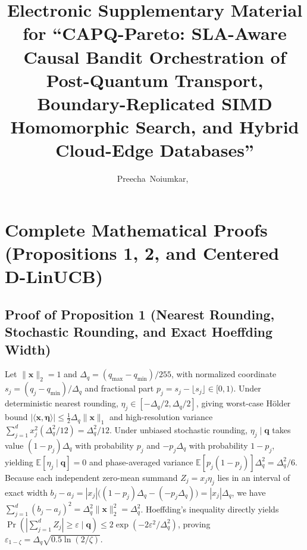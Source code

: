 \documentclass[10pt,journal,compsoc]{IEEEtran}
\begin{document}
\title{Electronic Supplementary Material for ``CAPQ-Pareto: SLA-Aware Causal Bandit Orchestration of Post-Quantum Transport, Boundary-Replicated SIMD Homomorphic Search, and Hybrid Cloud-Edge Databases''}

\author{Preecha~Noiumkar,~%
}

\maketitle

\section{Complete Mathematical Proofs (Propositions 1, 2, and Centered D-LinUCB)}
\subsection{Proof of Proposition 1 (Nearest Rounding, Stochastic Rounding, and Exact Hoeffding Width)}
Let $\|\mathbf{x}\|_2 = 1$ and $\Delta_q = (q_{\max}-q_{\min})/255$, with normalized coordinate $s_j = (q_j-q_{\min})/\Delta_q$ and fractional part $p_j = s_j - \lfloor s_j \rfloor \in [0,1)$. Under deterministic nearest rounding, $\eta_j \in [-\Delta_q/2, \Delta_q/2]$, giving worst-case H\"{o}lder bound $|\langle \mathbf{x},\boldsymbol{\eta}\rangle| \le \frac{1}{2}\Delta_q\|\mathbf{x}\|_1$ and high-resolution variance $\sum_{j=1}^d x_j^2 (\Delta_q^2/12) = \Delta_q^2/12$. Under unbiased stochastic rounding, $\eta_j \mid \mathbf{q}$ takes value $(1-p_j)\Delta_q$ with probability $p_j$ and $-p_j\Delta_q$ with probability $1-p_j$, yielding $\mathbb{E}[\eta_j \mid \mathbf{q}] = 0$ and phase-averaged variance $\mathbb{E}[p_j(1-p_j)]\Delta_q^2 = \Delta_q^2/6$. Because each independent zero-mean summand $Z_j = x_j \eta_j$ lies in an interval of exact width $b_j - a_j = |x_j|\big((1-p_j)\Delta_q - (-p_j\Delta_q)\big) = |x_j|\Delta_q$, we have $\sum_{j=1}^d (b_j - a_j)^2 = \Delta_q^2 \|\mathbf{x}\|_2^2 = \Delta_q^2$. Hoeffding's inequality directly yields $\Pr(|\sum_{j=1}^d Z_j| \ge \varepsilon \mid \mathbf{q}) \le 2\exp(-2\varepsilon^2/\Delta_q^2)$, proving $\varepsilon_{1-\zeta} = \Delta_q\sqrt{0.5\ln(2/\zeta)}$.
\end{document}
